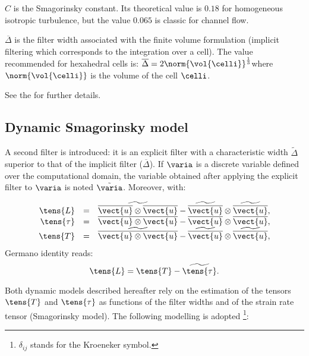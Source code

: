 $C$ is the Smagorinsky constant. Its theoretical value is $0.18$ for
homogeneous isotropic turbulence, but the value $0.065$ is classic for
channel flow.

$\overline{\Delta }$ is the filter width associated with the finite volume
formulation (implicit filtering which corresponds to the integration over a
cell). The value recommended for hexahedral cells is: $\overline{\Delta }
=2 \norm{\vol{\celli}}^{\frac{1}{3}}$where $\norm{\vol{\celli}}$ is the volume of the cell $\celli$.

See the  for further details.

\subsection{Dynamic Smagorinsky model}

\hypertarget{dynsmago}{}

A second filter is introduced: it is an explicit filter with a
characteristic width $\widetilde{\Delta }$ superior to that of the implicit
filter ($\overline{\Delta }$). If $\varia$ is a discrete variable defined over
the computational domain, the variable obtained after applying the explicit
filter to $\varia$ is noted $\tilde{\varia}$. Moreover, with:

\begin{equation}
\begin{array}{ r c l}
\tens{L} & = &\widetilde{\overline{\vect{u}} \otimes \overline{\vect{u}}}
-\widetilde{\overline{\vect{u}}} \otimes \widetilde{\overline{ \vect{u}}}, \\
\tens{\tau} & = & \overline{ \vect{u} \otimes \vect{u}}-\overline{\vect{u}} \otimes \overline{ \vect{u}}, \\
\tens{T} &= &\widetilde{\overline{ \vect{u} \otimes \vect{u}}}-\widetilde{\overline{\vect{u}}} \otimes
\widetilde{\overline{ \vect{u}}},
\end{array}
\end{equation}
Germano identity reads:
\begin{equation}
\tens{L} = \tens{T}-\widetilde{\tens{\tau}}.
\end{equation}

Both dynamic models described hereafter rely on the estimation of the tensors
$\tens{T}$ and $\tens{\tau}$ as functions of the filter widths and of the
strain rate tensor (Smagorinsky model). The following modelling is adopted%
\footnote{$\delta_{ij}$ stands for the Kroeneker symbol.}:

